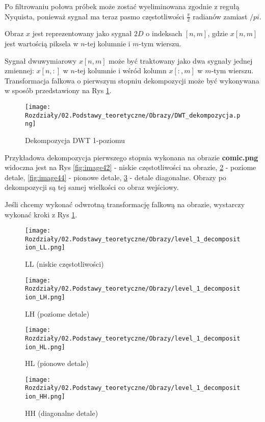Po filtrowaniu połowa próbek może zostać wyeliminowana zgodnie z regułą Nyquista, ponieważ sygnał ma teraz pasmo częstotliwości $\frac{\pi}{2}$ radianów zamiast $/pi$.

Obraz $x$ jest reprezentowany jako sygnał $2 D$ o indeksach $[n,m]$, gdzie $x[n,m]$ jest wartością piksela w $n$-tej kolumnie i $m$-tym wierszu.

Sygnał dwuwymiarowy $x[n,m]$ może być traktowany jako dwa sygnały jednej zmiennej: $x[n,:]$ w $n$-tej kolumnie i wśród kolumn $x[:,m]$ w $m$-tym wierszu. Transformacja falkowa o pierwszym stopniu dekompozycji może być wykonywana w sposób przedstawiony na Rys \ref{fig:image41}.

\begin{figure}[ht]
    \centering
    \begin{minipage}[t]{0.6\linewidth}
        \texttt{[image: Rozdziały/02.Podstawy\_teoretyczne/Obrazy/DWT\_dekompozycja.png]}
        \caption{Dekompozycja DWT 1-poziomu}
        \label{fig:image41}
    \end{minipage}
\end{figure}

Przykładowa dekompozycja pierwszego stopnia wykonana na obrazie \textbf{comic.png} widoczna jest na Rys \ref{fig:image42} - niskie częstotliwości na obrazie, \ref{fig:image43} - poziome detale, \ref{fig:image44} - pionowe detale, \ref{fig:image45} - detale diagonalne. Obrazy po dekompozycji są tej samej wielkości co obraz wejściowy. 

Jeśli chcemy wykonać odwrotną transformację falkową na obrazie, wystarczy wykonać kroki z Rys \ref{fig:image41}. 


\begin{figure}[ht]
    \centering
    \begin{minipage}[t]{0.48\linewidth}
        \texttt{[image: Rozdziały/02.Podstawy\_teoretyczne/Obrazy/level\_1\_decomposition\_LL.png]}
        \caption{LL (niskie częstotliwości)}
        \label{fig:image42}
    \end{minipage}
    \centering
    \begin{minipage}[t]{0.48\linewidth}
        \texttt{[image: Rozdziały/02.Podstawy\_teoretyczne/Obrazy/level\_1\_decomposition\_LH.png]}
        \caption{LH (poziome detale)}
        \label{fig:image43}
    \end{minipage}
\end{figure}

\begin{figure}[ht]
    \centering
    \begin{minipage}[t]{0.48\linewidth}
        \texttt{[image: Rozdziały/02.Podstawy\_teoretyczne/Obrazy/level\_1\_decomposition\_HL.png]}
        \caption{HL (pionowe detale)}
        \label{fig:image44}
    \end{minipage}
    \centering
    \begin{minipage}[t]{0.48\linewidth}
        \texttt{[image: Rozdziały/02.Podstawy\_teoretyczne/Obrazy/level\_1\_decomposition\_HH.png]}
        \caption{HH (diagonalne detale)}
        \label{fig:image45}
    \end{minipage}
\end{figure}
